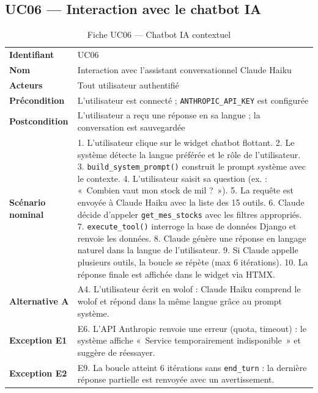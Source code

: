 \documentclass[12pt,a4paper,twoside]{report}
\begin{document}
\subsection{UC06 --- Interaction avec le chatbot IA}

\begin{table}[H]
\centering
\caption{Fiche UC06 --- Chatbot IA contextuel}
\label{tab:uc06}
\begin{tabular}{L{3.5cm}L{10cm}}
\toprule
\textbf{Identifiant}   & UC06 \\
\textbf{Nom}           & Interaction avec l'assistant conversationnel Claude Haiku \\
\textbf{Acteurs}       & Tout utilisateur authentifié \\
\textbf{Précondition}  & L'utilisateur est connecté ; \texttt{ANTHROPIC\_API\_KEY} est configurée \\
\textbf{Postcondition} & L'utilisateur a reçu une réponse en sa langue ; la conversation est sauvegardée \\
\midrule
\textbf{Scénario nominal} &
  1. L'utilisateur clique sur le widget chatbot flottant.
  2. Le système détecte la langue préférée et le rôle de l'utilisateur.
  3. \texttt{build\_system\_prompt()} construit le prompt système avec le contexte.
  4. L'utilisateur saisit sa question (ex. : «~Combien vaut mon stock de mil ?~»).
  5. La requête est envoyée à Claude Haiku avec la liste des 15 outils.
  6. Claude décide d'appeler \texttt{get\_mes\_stocks} avec les filtres appropriés.
  7. \texttt{execute\_tool()} interroge la base de données Django et renvoie les données.
  8. Claude génère une réponse en langage naturel dans la langue de l'utilisateur.
  9. Si Claude appelle plusieurs outils, la boucle se répète (max 6 itérations).
  10. La réponse finale est affichée dans le widget via HTMX. \\
\midrule
\textbf{Alternative A} &
  A4. L'utilisateur écrit en wolof : Claude Haiku comprend le wolof et répond
  dans la même langue grâce au prompt système. \\
\textbf{Exception E1}  &
  E6. L'API Anthropic renvoie une erreur (quota, timeout) : le système affiche
  «~Service temporairement indisponible~» et suggère de réessayer. \\
\textbf{Exception E2}  &
  E9. La boucle atteint 6 itérations sans \texttt{end\_turn} : la dernière réponse
  partielle est renvoyée avec un avertissement. \\
\bottomrule
\end{tabular}
\end{table}
\end{document}
